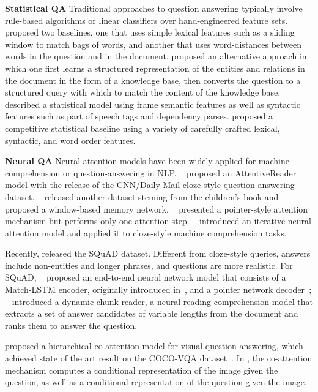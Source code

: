\documentclass{article} \usepackage{iclr2017_conference,times}
\begin{document}
\textbf{Statistical QA}
Traditional approaches to question answering typically involve rule-based algorithms or linear classifiers over hand-engineered feature sets.
\citet{richardson2013mctest} proposed two baselines, one that uses simple lexical features such as a sliding window to match bags of words, and another that uses word-distances between words in the question and in the document.
\citet{berant2014modeling} proposed an alternative approach in which one first learns a structured representation of the entities and relations in the document in the form of a knowledge base, then converts the question to a structured query with which to match the content of the knowledge base.
\citet{wang2015frame} described a statistical model using frame semantic features as well as syntactic features such as part of speech tags and dependency parses.
\citet{chen2016thorough} proposed a competitive statistical baseline using a variety of carefully crafted lexical, syntactic, and word order features.

\textbf{Neural QA}
Neural attention models have been widely applied for machine comprehension or question-answering in NLP. ~\citet{hermann2015teaching} proposed an AttentiveReader model with the release of the CNN/Daily Mail cloze-style question answering dataset. ~\citet{hill2015goldilocks} released another dataset steming from the children's book and proposed a window-based memory network. ~\citet{kadlec2016text} presented a pointer-style attention mechanism but performs only one attention step. ~\citet{sordoni2016iterative} introduced an iterative neural attention model and applied it to cloze-style machine comprehension tasks.

Recently, \citet{rajpurkar2016squad} released the SQuAD dataset. Different from cloze-style queries, answers include non-entities and longer phrases, and questions are more realistic. For SQuAD, ~\citet{wang2016machine} proposed an end-to-end neural network model that consists of a Match-LSTM encoder, originally introduced in~\citet{wang2015learning}, and a pointer network decoder~\citep{vinyals2015pointer}; ~\citet{yuyang2015} introduced a dynamic chunk reader, a neural reading comprehension model that extracts a set of answer candidates of variable lengths from the document and ranks them to answer the question.

\citet{lu2016hierarchical} proposed a hierarchical co-attention model for visual question answering, which achieved state of the art result on the COCO-VQA dataset~\citep{antol2015vqa}. In \citep{lu2016hierarchical}, the co-attention mechanism computes a conditional representation of the image given the question, as well as a conditional representation of the question given the image.
\end{document}
